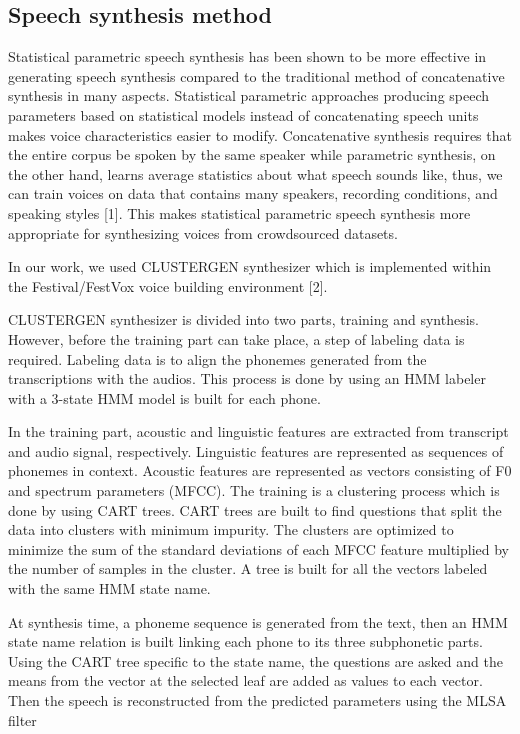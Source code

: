 \documentclass[12pt]{article}
\begin{document}
\subsection{Speech synthesis method}
Statistical parametric speech synthesis has been shown to be more effective in generating speech synthesis compared to the traditional method of concatenative synthesis in many aspects. Statistical parametric approaches producing speech parameters based on statistical models instead of concatenating speech units makes voice characteristics easier to modify. Concatenative synthesis requires that the entire corpus be spoken by the same speaker while parametric synthesis, on the other hand, learns average statistics about what speech sounds like, thus, we can train voices on data that contains many speakers, recording conditions, and speaking styles [1]. This makes statistical parametric speech synthesis more appropriate for synthesizing voices from crowdsourced datasets.

In our work, we used CLUSTERGEN synthesizer which is implemented within the Festival/FestVox voice building environment [2].

CLUSTERGEN synthesizer is divided into two parts, training and synthesis. However, before the training part can take place, a step of labeling data is required. Labeling data is to align the phonemes generated from the transcriptions with the audios. This process is done by using an HMM labeler with a 3-state HMM model is built for each phone.

In the training part, acoustic and linguistic features are extracted from transcript and audio signal, respectively. Linguistic features are represented as sequences of phonemes in context. Acoustic features are represented as vectors consisting of F0 and spectrum parameters (MFCC). The training is a clustering process which is done by using CART trees. CART trees are built to find questions that split the data into clusters with minimum impurity. The clusters are optimized to minimize the sum of the standard deviations of each MFCC feature multiplied by the number of samples in the cluster. A tree is built for all the vectors labeled with the same HMM state name.

At synthesis time, a phoneme sequence is generated from the text, then an HMM state name relation is built linking each phone to its three subphonetic parts. Using the CART tree specific to the state name, the questions are asked and the means from the vector at the selected leaf are added as values to each vector. Then the speech is reconstructed from the predicted parameters using the MLSA filter
\end{document}
